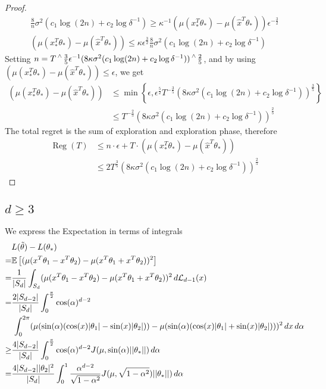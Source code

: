 \begin{proof}
    \begin{align*}
        \frac{8}{n}\sigma^2(c_1\log(2n)+c_2\log{\delta^{-1}}) \geq \kappa^{-1}(\mu(x_*^T\theta_*)-\mu(\hat{x}^T\theta_*))\epsilon^{-\frac{3}{2}}\\
        (\mu(x_*^T\theta_*)-\mu(\hat{x}^T\theta_*)) \leq \kappa\epsilon^{\frac{3}{2}}\frac{8}{n}\sigma^2(c_1\log(2n)+c_2\log{\delta^{-1}})
    \end{align*}
    Setting $n= T\caret{\frac{3}{5}}\epsilon^{-1}(8\kappa\sigma^2(c_1\log(2n)+c_2\log{\delta^{-1}}))\caret\frac{2}{5}$, and by using $(\mu(x_*^T\theta_*)-\mu(\hat{x}^T\theta_*)) \leq \epsilon$, we get
    \begin{align*}
        (\mu(x_*^T\theta_*)-\mu(\hat{x}^T\theta_*)) &\leq \min\left\{\epsilon, \epsilon^{\frac{5}{2}}T^{-\frac{3}{5}}(8\kappa\sigma^2(c_1\log(2n)+c_2\log{\delta^{-1}}))^{\frac{3}{5}}\right\}\\
        &\leq T^{-\frac{2}{5}}(8\kappa\sigma^2(c_1\log(2n)+c_2\log{\delta^{-1}}))^{\frac{2}{5}}
    \end{align*}
    The total regret is the sum of exploration and exploration phase, therefore
    \begin{align*}
        \operatorname{Reg}(T) &\leq n\cdot\epsilon + T\cdot(\mu(x_*^T\theta_*)-\mu(\hat{x}^T\theta_*))\\
        &\leq 2 T^{\frac{3}{5}}(8\kappa\sigma^2(c_1\log(2n)+c_2\log{\delta^{-1}}))^{\frac{2}{5}}
    \end{align*}
\end{proof}
\subsection{$d\geq 3$}
We express the Expectation in terms of integrals
\begin{align*}
   & L(\tilde{\theta})-L(\theta_*)\\
    =&\mathbb{E}\left[(\mu(x^T\theta_1-x^T\theta_2)-\mu(x^T\theta_1+x^T\theta_2))^2\right]\\
    =&\frac{1}{|S_d|}\int_{S_d}(\mu(x^T\theta_1-x^T\theta_2)-\mu(x^T\theta_1+x^T\theta_2))^2 \,d\mathcal{L}_{d-1}(x)\\
    =& \frac{2|S_{d-2}|}{|S_d|}\int_{0}^{\frac{\pi}{2}}\cos(\alpha)^{d-2}\\
    &\,\int_{0}^{2\pi}(\mu(\sin(\alpha)(\cos(x)|\theta_1|-\sin(x)|\theta_2|))-\mu(\sin(\alpha)(\cos(x)|\theta_1|+\sin(x)|\theta_2|)))^2 \,dx\,d\alpha\\
    \geq& \frac{4|S_{d-2}|}{|S_d|}\int_{0}^{\frac{\pi}{2}}\cos(\alpha)^{d-2}
    J(\mu,\sin(\alpha)||\theta_*||)\,d\alpha\\
    =& \frac{4|S_{d-2}||\theta_2|^2}{|S_d|}\int_{0}^{1}\frac{\alpha^{d-2}}{\sqrt{1-\alpha^2}}
    J(\mu,\sqrt{1-\alpha^2})||\theta_*||)\,d\alpha\\
\end{align*}
